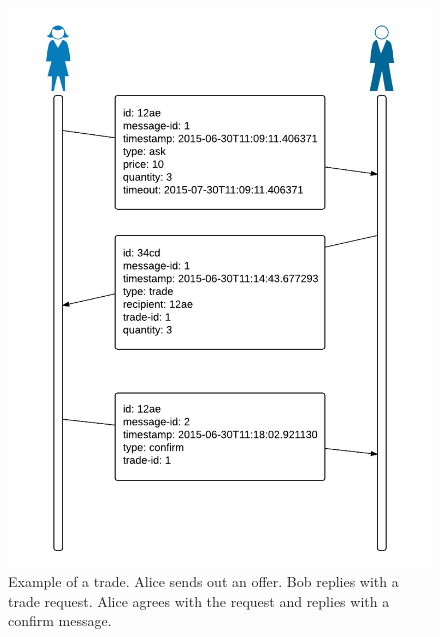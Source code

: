 \begin{figure}[H]
  \centering
  \includegraphics[width=\textwidth]{trade}
  \caption{Example of a trade. Alice sends out an offer. Bob replies with a trade request. Alice agrees with the request and replies with a confirm message.}
  \label{tradefig}
\end{figure}

